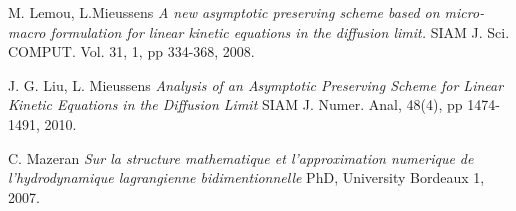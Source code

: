 \documentclass[a4paper,french,english,10pt]{article}
\begin{document}
{\begin{thebibliography}{abcde}
 M. Lemou, L.Mieussens \emph{A new asymptotic preserving
scheme based on micro-macro formulation for linear kinetic equations in the
diffusion limit.} SIAM J. Sci. COMPUT. Vol. 31, 1, pp 334-368, 2008.

 J. G. Liu, L. Mieussens \emph{Analysis of an Asymptotic
Preserving Scheme for Linear Kinetic Equations in the Diffusion Limit} SIAM J.
Numer. Anal,  48(4), pp 1474-1491, 2010.

 C. Mazeran \emph{Sur la structure mathematique et
l'approximation numerique de l'hydrodynamique lagrangienne bidimentionnelle}
 PhD, University Bordeaux 1, 2007.
\end{thebibliography}

}
\end{document}
